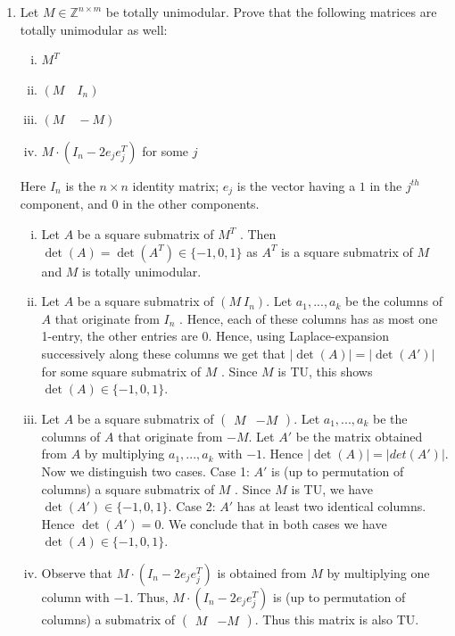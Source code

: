 \documentclass[11pt]{article}
\institute{\'Ecole Polytechnique F\'ed\'erale de Lausanne}
\newcommand{\setZ}{\mathbb{Z}}
\begin{document}
\makeheader

\begin{enumerate}[1)]

\item 
Let $M\in \setZ^{n\times m}$ be totally unimodular. Prove that the following matrices
are totally unimodular as well:
\begin{enumerate}[i)]
\item $M^T$
\item  $( M \quad I_n )$
\item $(M \quad -M)$
\item $M \cdot (I_n - 2 e_j e_j^T )$ for some $j$
\end{enumerate}
Here $I_n$ is the $n\times n$ identity matrix; $e_j$ is the vector having a $1$ in the $j^{th}$ component, and $0$ in the other components.

\begin{solution}
\begin{enumerate}[i)]
\item Let $A$ be a square submatrix of $M^T$ . Then
$\det(A)= \det(A^T ) ∈ \{−1,0,1\}$
as $A^T$ is a square submatrix of $M$ and $M$ is totally unimodular.

\item Let $A$ be a square submatrix of $(M \ I_n)$. Let $a_1,..., a_k$ be the columns of $A$ that originate from $I_n$ . Hence, each of these columns has as most one 1-entry, the other entries are 0. Hence, using Laplace-expansion successively along these columns we get
that $|\det(A)| = | \det(A')|$ for some square submatrix of $M$ . Since $M$ is TU, this shows
$\det(A) ∈ \{−1,0,1\}$.

\item Let $A$ be a square submatrix of $\begin{pmatrix} M&  -M \end{pmatrix}$. Let $a_1,..., a_k$ be the columns of $A$ that
originate from $−M$. Let $A'$ be the matrix obtained from $A$ by multiplying $a_1,..., a_k$ with
$-1$. Hence
$| \det(A)| = | det(A')|$.
Now we distinguish two cases.
Case 1: $A'$ is (up to permutation of columns) a square submatrix of $M$ . Since $M$ is TU,
we have $\det(A') ∈ \{−1,0,1\}$.
Case 2: $A'$ has at least two identical columns. Hence $\det(A')= 0$.
We conclude that in both cases we have $\det(A) ∈ \{−1,0,1\}$.
\item Observe that $M\cdot (I_n− 2e_j e_j^T)$ is obtained from $M$ by multiplying one column with $-1$.
Thus, $M\cdot (I_n− 2e_j e_j^T)$ is (up to permutation of columns) a submatrix of  $\begin{pmatrix}M & -M\end{pmatrix}$. Thus this matrix is also TU. 
\end{enumerate}
\end{solution}



\end{enumerate}
\end{document}
